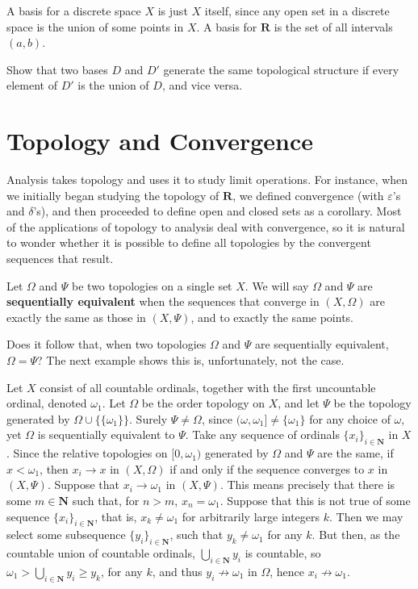 A basis for a discrete space $X$ is just $X$ itself, since any open set in a discrete space is the union of some points in $X$. A basis for $\mathbf{R}$ is the set of all intervals $(a,b)$.

\begin{exercise}
    Show that two bases $D$ and $D'$ generate the same topological structure if every element of $D'$ is the union of $D$, and vice versa.
\end{exercise}

\section{Topology and Convergence}

Analysis takes topology and uses it to study limit operations. For instance, when we initially began studying the topology of $\mathbf{R}$, we defined convergence (with $\varepsilon$'s and $\delta$'s), and then proceeded to define open and closed sets as a corollary. Most of the applications of topology to analysis deal with convergence, so it is natural to wonder whether it is possible to define all topologies by the convergent sequences that result.

\begin{definition}
    Let $\Omega$ and $\Psi$ be two topologies on a single set $X$. We will say $\Omega$ and $\Psi$ are {\bf sequentially equivalent} when the sequences that converge in $(X,\Omega)$ are exactly the same as those in $(X, \Psi)$, and to exactly the same points.
\end{definition}

Does it follow that, when two topologies $\Omega$ and $\Psi$ are sequentially equivalent, $\Omega = \Psi$? The next example shows this is, unfortunately, not the case.

\begin{example}
    Let $X$ consist of all countable ordinals, together with the first uncountable ordinal, denoted $\omega_1$. Let $\Omega$ be the order topology on $X$, and let $\Psi$ be the topology generated by $\Omega \cup \{ \{ \omega_1 \} \}$. Surely $\Psi \neq \Omega$, since $(\omega, \omega_1] \neq \{ \omega_1 \}$ for any choice of $\omega$, yet $\Omega$ is sequentially equivalent to $\Psi$. Take any sequence of ordinals $\{ x_i \}_{i \in \mathbf{N}}$ in $X$. Since the relative topologies on $[0,\omega_1)$ generated by $\Omega$ and $\Psi$ are the same, if $x < \omega_1$, then $x_i \to x$ in $(X, \Omega)$ if and only if the sequence converges to $x$ in $(X,\Psi)$. Suppose that $x_i \to \omega_1$ in $(X, \Psi)$. This means precisely that there is some $m \in \mathbf{N}$ such that, for $n > m$, $x_n = \omega_1$. Suppose that this is not true of some sequence $\{ x_i \}_{i \in \mathbf{N}}$, that is, $x_k \neq \omega_1$ for arbitrarily large integers $k$. Then we may select some subsequence $\{ y_i \}_{i \in \mathbf{N}}$, such that $y_k \neq \omega_1$ for any $k$. But then, as the countable union of countable ordinals, $\bigcup_{i \in \mathbf{N}} y_i$ is countable, so $\omega_1 > \bigcup_{i \in \mathbf{N}} y_i \geq y_k$, for any $k$, and thus $y_i \not \to \omega_1$ in $\Omega$, hence $x_i \not \to \omega_1$.
\end{example}

